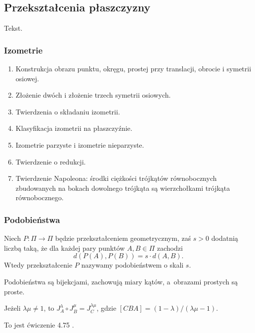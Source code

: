 %

\subsection{Przekształcenia płaszczyzny}
Tekst.

\subsubsection{Izometrie}
\begin{enumerate}
\item Konstrukcja obrazu punktu, okręgu, prostej przy translacji, obrocie i symetrii osiowej.
\item Złożenie dwóch i złożenie trzech symetrii osiowych.
\item Twierdzenia o składaniu izometrii.
\item Klasyfikacja izometrii na płaszczyźnie.
\item Izometrie parzyste i izometrie nieparzyste.
\item Twierdzenie o redukcji.
\item Twierdzenie Napoleona: środki ciężkości trójkątów równobocznych zbudowanych na bokach dowolnego trójkąta są wierzchołkami trójkąta równobocznego.
\end{enumerate}

\subsubsection{Podobieństwa}
\begin{definition}[podobieństwo]
    Niech $P \colon \Pi \to \Pi$ będzie przekształceniem geometrycznym, zaś $s > 0$ dodatnią liczbą taką, że dla każdej pary punktów $A, B \in \Pi$ zachodzi
    \begin{equation}
        d(P(A), P(B)) = s \cdot d(A, B).
    \end{equation}
    Wtedy przekształcenie $P$ nazywamy podobieństwem o skali $s$.
\end{definition}

Podobieństwa są bijekcjami, zachowują miary kątów, a~obrazami prostych są proste.

\begin{proposition}
    Jeżeli $\lambda \mu \neq 1$, to $J_A^\lambda \circ J_B^\mu = J_C^{\lambda \mu}$, gdzie $[CBA] = (1-\lambda) / (\lambda \mu - 1)$.
\end{proposition}

To jest ćwiczenie 4.75 \cite[s. 217]{neugebauer_2018}.

